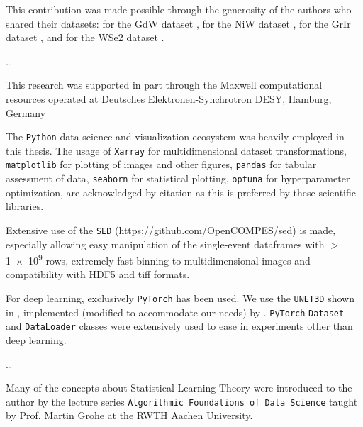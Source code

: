 
This contribution was made possible through the generosity of the authors who shared their datasets: \citeauthor{kutnyakhovMultidimensionalPhotoemissionSpectra2024} for the \gls{GdW} dataset \cite{kutnyakhovMultidimensionalPhotoemissionSpectra2024}, \citeauthor{shokeenRealtimeObservationNonequilibrium2024} for the \gls{NiW} dataset \cite{shokeenRealtimeObservationNonequilibrium2024}, \citeauthor{heberMultispectralTimeresolvedEnergy2022} for the \gls{GrIr} dataset \cite{heberMultispectralTimeresolvedEnergy2022}, and \citeauthor{maklarTimeresolvedARPESRAW2022} for the \gls{WSe2} dataset \cite{maklarTimeresolvedARPESRAW2022}.

\dots

This research was supported in part through the Maxwell computational resources operated at Deutsches Elektronen-Synchrotron DESY, Hamburg, Germany

The \texttt{Python} data science and visualization ecosystem was heavily employed in this thesis.
The usage of \texttt{Xarray} \cite{hoyerXarrayNDLabeled2017} for multidimensional dataset transformations, \texttt{matplotlib} \cite{hunterMatplotlib2DGraphics2007} for plotting of images and other figures, \texttt{pandas} \cite{thepandasdevelopmentteamPandasdevPandasPandas2024} for tabular assessment of data, \texttt{seaborn} \cite{waskomSeabornStatisticalData2021} for statistical plotting, \texttt{optuna} \cite{akibaOptunaNextgenerationHyperparameter2019} for hyperparameter optimization, are acknowledged by citation as this is preferred by these scientific libraries. 

Extensive use of the \texttt{SED} (\href{https://github.com/OpenCOMPES/sed}{https://github.com/OpenCOMPES/sed}) is made, especially allowing easy manipulation of the single-event dataframes with $>$\num{1e9} rows, extremely fast binning to multidimensional images and compatibility with \gls{HDF5} and tiff formats.

For deep learning, exclusively \texttt{PyTorch} \cite{paszkePyTorchImperativeStyle2019} has been used. We use the \texttt{UNET3D} shown in \cite{cicek3DUNetLearning2016}, implemented (modified to accommodate our needs) by \citeauthor{wolnyAccurateVersatile3D2020} \cite{wolnyAccurateVersatile3D2020}. \texttt{PyTorch} \texttt{Dataset} and \texttt{DataLoader} classes were extensively used to ease in experiments other than deep learning.


\dots

Many of the concepts about Statistical Learning Theory were introduced to the author by the lecture series \texttt{Algorithmic Foundations of Data Science} taught by Prof. Martin Grohe at the RWTH Aachen University.
